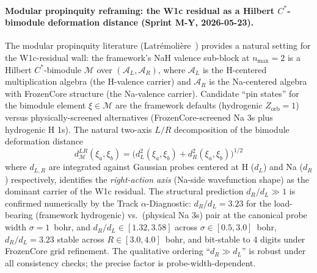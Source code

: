 \documentclass[aps,pra,twocolumn,superscriptaddress,longbibliography]{revtex4-2}
\begin{document}
\paragraph{Modular propinquity reframing: the W1c residual as a Hilbert
$C^*$-bimodule deformation distance (Sprint M-Y, 2026-05-23).}
The modular propinquity literature
(Latr\'emoli\`ere~\cite{latremoliere2019modular,latremoliere2021dual})
provides a natural setting for the W1c-residual wall: the framework's
NaH valence sub-block at $n_{\max}=2$ is a Hilbert
$C^*$-bimodule $\mathcal{M}$ over $(\mathcal{A}_L, \mathcal{A}_R)$,
where $\mathcal{A}_L$ is the H-centered multiplication algebra (the
H-valence carrier) and $\mathcal{A}_R$ is the Na-centered algebra
with FrozenCore structure (the Na-valence carrier).  Candidate
``pin states'' for the bimodule element $\xi \in \mathcal{M}$ are
the framework defaults (hydrogenic $Z_\text{orb}=1$) versus
physically-screened alternatives (FrozenCore-screened Na 3s plus
hydrogenic H 1s).  The natural two-axis $L/R$ decomposition of the
bimodule deformation distance
\[
  d_{\mathcal{M}}^{LR}(\xi_a, \xi_b)
  = \bigl(d_L^2(\xi_a, \xi_b) + d_R^2(\xi_a, \xi_b)\bigr)^{1/2}
\]
where $d_{L,R}$ are integrated against Gaussian probes centered at
H ($d_L$) and Na ($d_R$) respectively, identifies the
\emph{right-action axis} (Na-side wavefunction shape) as the dominant
carrier of the W1c residual.  The structural prediction $d_R/d_L \gg 1$
is confirmed numerically by the Track $\alpha$-Diagnostic:
$d_R/d_L = 3.23$ for the load-bearing (framework hydrogenic) vs.\
(physical Na 3s) pair at the canonical probe width $\sigma = 1$~bohr,
and $d_R/d_L \in [1.32, 3.58]$ across $\sigma \in [0.5, 3.0]$~bohr,
$d_R/d_L = 3.23$ stable across $R \in [3.0, 4.0]$~bohr, and bit-stable
to 4 digits under FrozenCore grid refinement.  The qualitative ordering
``$d_R \gg d_L$'' is robust under all consistency checks; the precise
factor is probe-width-dependent.
\end{document}
